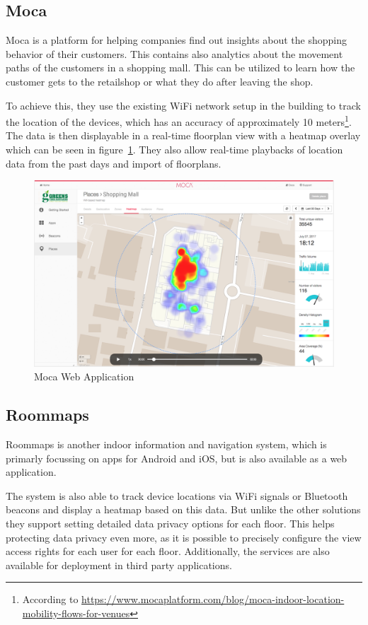 \subsection{Moca}

Moca is a platform for helping companies find out insights about the shopping behavior of their customers. This contains also analytics about the movement paths of the customers in a shopping mall. 
This can be utilized to learn how the customer gets to the retailshop or what they do after leaving the shop.

To achieve this, they use the existing WiFi network setup in the building to track the location of the devices, which has an accuracy of approximately 10 meters\footnote{According to  \url{https://www.mocaplatform.com/blog/moca-indoor-location-mobility-flows-for-venues}}. The data is then displayable in a real-time floorplan view with a heatmap overlay which can be seen in figure~\ref{fig:MocaApplication}. They also allow real-time playbacks of location data from the past days and import of floorplans.

\begin{figure}[!hb]
	\centering
	\includegraphics[width=0.9\linewidth]{images/Moca}
	\caption{Moca Web Application}
	\label{fig:MocaApplication}
\end{figure}

\clearpage

\subsection{Roommaps}

Roommaps is another indoor information and navigation system, which is primarly focussing on apps for Android and iOS, but is also available as a web application.

The system is also able to track device locations via WiFi signals or Bluetooth beacons and display a heatmap based on this data. 
But unlike the other solutions they support setting detailed data privacy options for each floor. This helps protecting data privacy even more, as it is possible to precisely configure the view access rights for each user for each floor. Additionally, the services are also available for deployment in third party applications.


